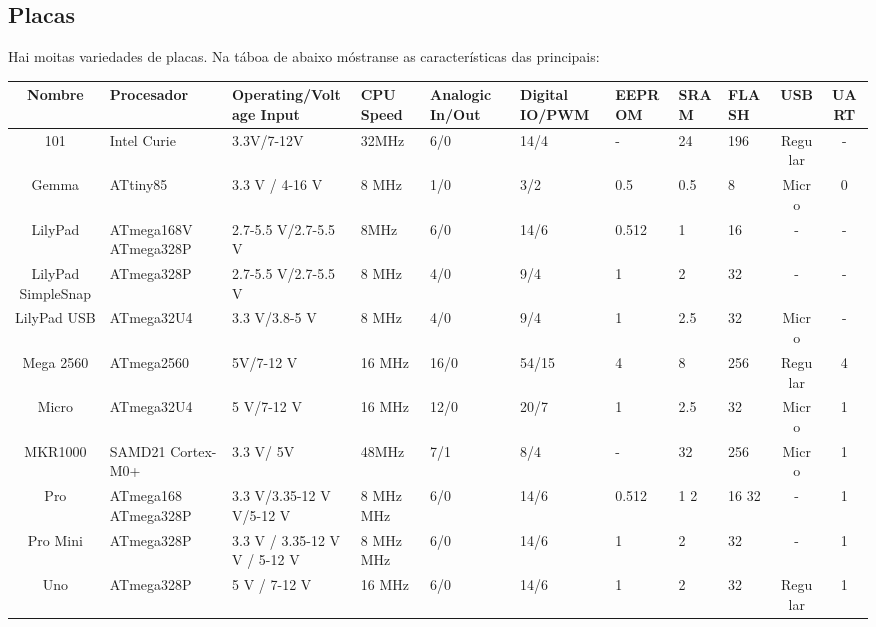\documentclass[11pt,twoside]{book}
\begin{document}
\subsection{Placas}

Hai moitas variedades de placas. Na táboa de abaixo móstranse as características das principais:

\begin{table}[htb]
\begin{center}
\resizebox{16cm}{!} {
\begin{tabular}{|c|m{3cm}|m{3.5cm}|m{2cm}|m{2cm}|m{2cm}|m{2cm}|m{2cm}|m{2cm}|c|c|}
\hline
Nombre & Procesador & Operating/Voltage Input & CPU Speed & Analogic In/Out & Digital IO/PWM & EEPROM & SRAM & FLASH & USB & UART \\
\hline
101 & Intel Curie & 3.3V/7-12V & 32MHz & 6/0 & 14/4 & - & 24 & 196 & Regular & - \\ 
\hline
Gemma & ATtiny85 & 3.3 V / 4-16 V & 8 MHz & 1/0 & 3/2 & 0.5 & 0.5 & 8 & Micro & 0 \\
\hline
LilyPad & ATmega168V \newline ATmega328P & 2.7-5.5 V/2.7-5.5 V & 8MHz & 6/0 & 14/6 & 0.512 & 1 & 16 & - & - \\
\hline
LilyPad SimpleSnap & ATmega328P & 2.7-5.5 V/2.7-5.5 V & 8 MHz & 4/0 & 9/4 & 1 & 2 & 32 & - & - \\
\hline
LilyPad USB & ATmega32U4 & 3.3 V/3.8-5 V & 8 MHz & 4/0 & 9/4 & 1 & 2.5 & 32 & Micro & - \\
\hline
Mega 2560 & ATmega2560 & 5V/7-12 V & 16 MHz & 16/0 & 54/15 & 4 & 8 & 256 & Regular & 4 \\
\hline
Micro & ATmega32U4 & 5 V/7-12 V & 16 MHz & 12/0 & 20/7 & 1 & 2.5 & 32 & Micro & 1 \\
\hline
MKR1000 & SAMD21 Cortex-M0+ & 3.3 V/ 5V  & 48MHz  & 7/1 & 8/4 & - & 32 & 256 & Micro & 1 \\
\hline
Pro & ATmega168 ATmega328P & 3.3 V/3.35-12 V \newline  5 V/5-12 V & 8 MHz  \newline  16 MHz & 6/0 & 14/6 & 0.512 \newline 1 & 1   2 & 16  32 & - & 1 \\
\hline
Pro Mini & ATmega328P & 3.3 V / 3.35-12 V \newline  5 V / 5-12 V & 8 MHz \newline  16 MHz & 6/0 & 14/6 & 1 & 2 & 32 & - & 1 \\
\hline
Uno & ATmega328P & 5 V / 7-12 V & 16 MHz & 6/0 & 14/6 & 1 & 2 & 32 & Regular & 1 \\

\end{tabular}}
\end{center}
\end{table}
\end{document}
